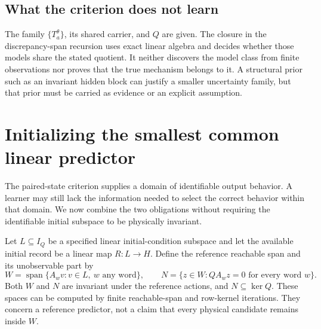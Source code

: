\documentclass[11pt,letterpaper]{article}
\theoremstyle{plain}
\theoremstyle{definition}
\newcommand{\Span}{\operatorname{span}}\newcommand{\Pow}{\mathcal P}
\begin{document}
\subsection{What the criterion does not learn}
The family $\{T_a^\theta\}$, its shared carrier, and $Q$ are given. The closure in the discrepancy-span recursion uses exact linear algebra and decides whether those models share the stated quotient. It neither discovers the model class from finite observations nor proves that the true mechanism belongs to it. A structural prior such as an invariant hidden block can justify a smaller uncertainty family, but that prior must be carried as evidence or an explicit assumption.

\section{Initializing the smallest common linear predictor}\label{sec:linearpredictor}
The paired-state criterion supplies a domain of identifiable output behavior. A learner may still lack the information needed to select the correct behavior within that domain. We now combine the two obligations without requiring the identifiable initial subspace to be physically invariant.

Let $L\subseteq I_Q$ be a specified linear initial-condition subspace and let the available initial record be a linear map $R:L\to H$. Define the reference reachable span and its unobservable part by
\[
W=\Span\{A_wv:v\in L,\ w\text{ any word}\},\qquad
N=\{z\in W:QA_wz=0\text{ for every word }w\}.
\]
Both $W$ and $N$ are invariant under the reference actions, and $N\subseteq\ker Q$. These spaces can be computed by finite reachable-span and row-kernel iterations. They concern a reference predictor, not a claim that every physical candidate remains inside $W$.
\end{document}
